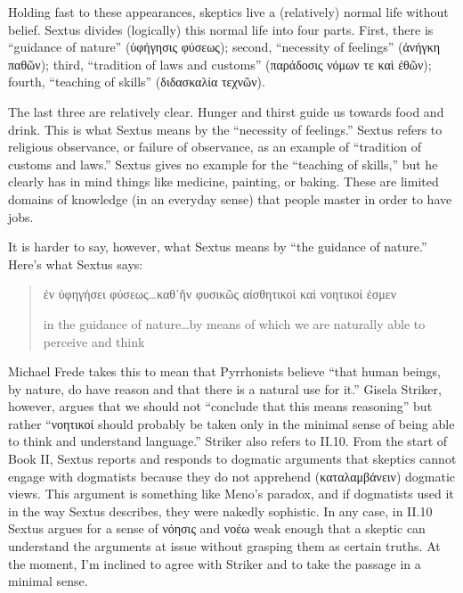 Holding fast to these appearances, skeptics live a (relatively) normal life without belief. Sextus divides (logically) this normal life into four parts. First, there is ``guidance of nature'' (\textgreek{ὑφήγησις φύσεως}); second, ``necessity of feelings'' (\textgreek{ἀνήγκη παθῶν}); third, ``tradition of laws and customs'' (\textgreek{παράδοσις νόμων τε καὶ ἐθῶν}); fourth, ``teaching of skills'' (\textgreek{διδασκαλία τεχνῶν}).

The last three are relatively clear. Hunger and thirst guide us towards food and drink. This is what Sextus means by the ``necessity of feelings.'' Sextus refers to religious observance, or failure of observance, as an example of ``tradition of customs and laws.'' Sextus gives no example for the ``teaching of skills,'' but he clearly has in mind things like medicine, painting, or baking. These are limited domains of knowledge (in an everyday sense) that people master in order to have jobs.

It is harder to say, however, what Sextus means by ``the guidance of nature.'' Here's what Sextus says:
\begin{quote}
    \textgreek{ἐν ὑφηγήσει φύσεως}\dots \textgreek{καθ᾽ἥν φυσικῶς αἰσθητικοὶ καὶ νοητικοί ἐσμεν}

    in the guidance of nature\dots by means of which we are naturally able to perceive and think
\end{quote}
Michael Frede takes this to mean that Pyrrhonists believe ``that human beings, by nature, do have reason and that there is a natural use for it.''\autocite[][95]{frede1988} Gisela Striker, however, argues that we should not ``conclude that this means reasoning'' but rather ``\textgreek{νοητικοί} should probably be taken only in the minimal sense of being able to think and understand language.''\autocite[][119--120, note 7]{striker2001} Striker also refers to II.10. From the start of Book II, Sextus reports and responds to dogmatic arguments that skeptics cannot engage with dogmatists because they do not apprehend (\textgreek{καταλαμβάνειν}) dogmatic views. This argument is something like Meno's paradox, and if dogmatists used it in the way Sextus describes, they were nakedly sophistic. In any case, in II.10 Sextus argues for a sense of \textgreek{νόησις} and \textgreek{νοέω} weak enough that a skeptic can understand the arguments at issue without grasping them as certain truths. At the moment, I'm inclined to agree with Striker and to take the passage in a minimal sense.

